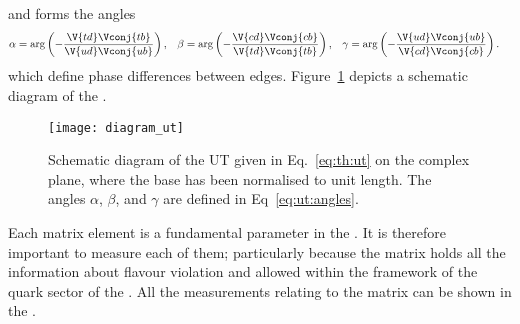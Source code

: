and forms the angles
\begin{align}
  \alpha &= \arg\left(-\frac{\V{td}\Vconj{tb}}{\V{ud}\Vconj{ub}}\right), &
  \beta  &= \arg\left(-\frac{\V{cd}\Vconj{cb}}{\V{td}\Vconj{tb}}\right), &
  \gamma &= \arg\left(-\frac{\V{ud}\Vconj{ub}}{\V{cd}\Vconj{cb}}\right).
  \label{eq:ut:angles}
\end{align}
which define phase differences between edges.
Figure~\ref{fig:th:ut} depicts a schematic diagram of the \ut.

\begin{figure}
  \begin{center}
      \texttt{[image: diagram\_ut]}
  \end{center}
  \caption[Schematic diagram of the Unitarity Triangle]
  {
    Schematic diagram of the UT given in Eq.~\protect\ref{eq:th:ut} on the complex
    plane, where the base has been normalised to unit length.
    The angles $\alpha$, $\beta$, and $\gamma$ are defined in Eq~\protect\ref{eq:ut:angles}.
  }
  \label{fig:th:ut}
\end{figure}


Each \ckm matrix element is a fundamental parameter in the \sm.
It is therefore important to
measure each of them; particularly because the \ckm matrix holds all
the information about flavour violation and \CPV allowed within the
framework of the quark sector of the \sm.
All the measurements relating to the \ckm matrix can be shown in the \ut.







